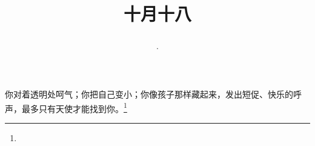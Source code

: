 \title{\date[d=18,m=11,y=2024][year:cn-y,年,month:cn,day:cn,日,·,weekday]·十月十八 }
你对着透明处呵气；你把自己变小；你像孩子那样藏起来，发出短促、快乐的呼声，最多只有天使才能找到你。\footnote{ }

